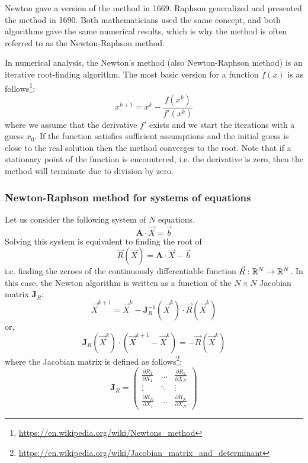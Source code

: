 Newton gave a version of the method in 1669. Raphson generalized and presented
the method in 1690. Both mathematicians used the same concept, and both algorithms gave the
same numerical results, which is why the method is often referred to as the Newton-Raphson method.

In numerical analysis, the Newton's method (also Newton-Raphson method) 
is an iterative root-finding algorithm.
The most basic version for a function $f(x)$ is as 
follows\footnote{\url{https://en.wikipedia.org/wiki/Newtons_method}}:
\[
x^{k+1} = x^k - \frac{f(x^k)}{f'(x^k)}
\]
where we assume that the derivative $f'$ exists and we start the iterations 
with a guess $x_0$.
If the function satisfies sufficient assumptions and the initial guess is close
to the real solution then the method converges to the root. 
Note that if a stationary point of the function is encountered, i.e. 
the derivative is zero, then the method will terminate due to division by zero. 

\subsubsection*{Newton-Raphson method for systems of equations}
Let us consider the following system of $N$ equations. 
\[
{\bm A} \cdot \vec{X} = \vec{b}
\]
Solving this system is equivalent to finding the root of 
\[
\vec{R}(\vec{X}) =  {\bm A} \cdot \vec{X} - \vec{b}
\]
i.e. finding the zeroes of the continuously differentiable function $\vec{R}: {\mathbb{R}}^N \rightarrow {\mathbb{R}}^N$. 
In this case, the Newton algorithm is written as a function of the $N\times N$ Jacobian 
matrix ${\bm J}_R$:
\begin{equation}
\vec{X}^{k+1} = \vec{X}^k - {\bm J}_R^{-1}(\vec{X}^k) \cdot {\vec R}(\vec{X}^k)
\end{equation}
or,
\begin{equation}
{\bm J}_R (\vec{X}^k) \cdot( \vec{X}^{k+1} - \vec{X}^k  )   = - \vec{R}(\vec{X}^k)
\label{eq:f87newt}
\end{equation}
where the Jacobian matrix is defined as 
follows\footnote{\url{https://en.wikipedia.org/wiki/Jacobian_matrix_and_determinant}}:
\[
{\bm J}_R = 
\left(
\begin{array}{ccc}
\frac{\partial R_1}{\partial X_1} & \dots & \frac{\partial R_1}{\partial X_N} \\
\vdots & \ddots & \vdots \\ 
\frac{\partial R_N}{\partial X_1} & \dots & \frac{\partial R_N}{\partial X_N} 
\end{array}
\right)
\]


